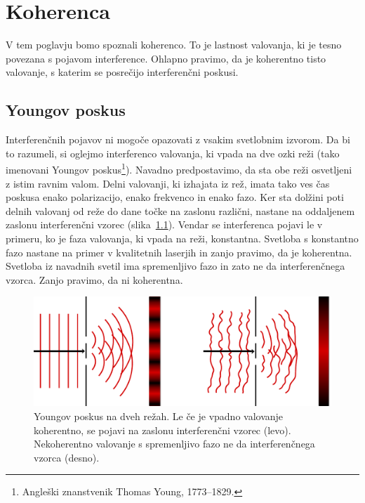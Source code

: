 
\chapter{Koherenca}

V tem poglavju bomo spoznali koherenco. To je lastnost
valovanja, ki je tesno povezana s pojavom interference. Ohlapno pravimo,
da je koherentno tisto valovanje, s katerim se posrečijo interferenčni
poskusi.  

\section{Youngov poskus}

Interferenčnih pojavov ni mogoče opazovati z
vsakim svetlobnim izvorom. Da bi to razumeli, si oglejmo interferenco
valovanja, ki vpada na dve ozki reži (tako imenovani Youngov 
poskus\footnote{Angleški znanstvenik Thomas Young, 1773--1829.}). 
Navadno predpostavimo, da
sta obe reži osvetljeni z istim ravnim valom. Delni valovanji, ki
izhajata iz rež, imata tako ves čas poskusa enako polarizacijo, enako
frekvenco in enako fazo. Ker sta dolžini poti delnih valovanj od reže do dane 
točke na zaslonu različni, nastane na oddaljenem
zaslonu interferenčni vzorec (slika~\ref{fig:Young}). Vendar se  
interferenca pojavi le v primeru,
ko je faza valovanja, ki vpada na reži, konstantna. Svetloba s konstantno
fazo nastane na primer v kvalitetnih laserjih in zanjo pravimo, da je koherentna.
Svetloba iz navadnih svetil ima spremenljivo fazo in zato ne da
interferenčnega vzorca. Zanjo pravimo, da ni koherentna. 
\begin{figure}[h]
\centering
\includegraphics[width=10truecm]{slike/02_Young.pdf}
\caption{Youngov poskus na dveh režah. Le če je vpadno valovanje koherentno, 
se pojavi na zaslonu interferenčni vzorec (levo). Nekoherentno valovanje s spremenljivo
fazo ne da interferenčnega vzorca (desno).}
\label{fig:Young}
\end{figure}

